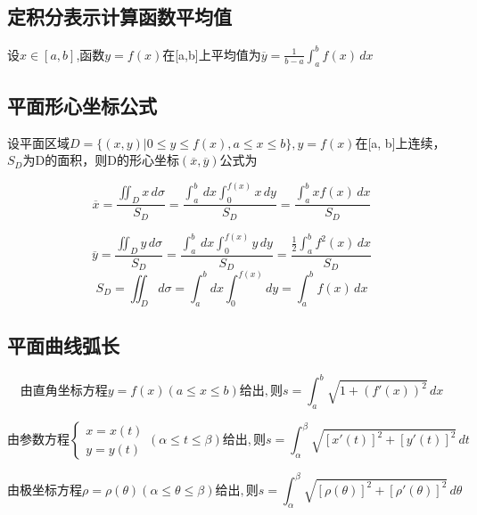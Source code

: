 \subsection{定积分表示计算函数平均值}

设\(x \in [a, b]\),函数\(y = f(x)\)在[a,b]上平均值为\(\overline{y} = \frac{1}{b- a} \int_{a}^{b} f(x) \,dx\)


\subsection{平面形心坐标公式}

设平面区域\(D = \{ (x, y) | 0 \leq y \leq f(x), a \leq x \leq b \}, y = f(x)\)在[a, b]上连续，\(S_D\)为D的面积，则D的形心坐标\((\overline{x}, \overline{y})\)公式为

\begin{displaymath}
\overline{x} = \frac{\iint_{D} x \,d\sigma}{S_D} = 
\frac{\int_{a}^{b} \,dx \int_{0}^{f(x)} x \,dy}{S_D} =
\frac{\int_{a}^{b} xf(x) \,dx}{S_D}
\end{displaymath}

\begin{displaymath}
\overline{y} = \frac{\iint_{D} y \,d\sigma}{S_D} = 
\frac{\int_{a}^{b} \,dx \int_{0}^{f(x)} y \,dy}{S_D} =
\frac{\frac{1}{2}\int_{a}^{b} f^2(x) \,dx}{S_D}
\end{displaymath}
\[S_D = \iint_{D}d\sigma = \int_{a}^{b}dx \int_{0}^{f(x)}dy = \int_{a}^{b} f(x)\,dx\]


\subsection{平面曲线弧长}

\begin{displaymath}
由直角坐标方程y = f(x)(a \leq x \leq b)给出,
则s = \int_{a}^{b} \sqrt{1 + (f'(x))^2} \,dx
\end{displaymath}

\begin{displaymath}
由参数方程
\begin{cases}
x = x(t) \\
y = y(t)
\end{cases}
(\alpha \leq t \leq \beta)给出,
则s = \int_{\alpha}^{\beta} \sqrt{[x'(t)]^2 + [y'(t)]^2} \,dt
\end{displaymath}

\begin{displaymath}
由极坐标方程\rho = \rho(\theta)(\alpha \leq \theta \leq \beta)给出,
则s = \int_{\alpha}^{\beta} \sqrt{[\rho(\theta)]^2 + [\rho'(\theta)]^2} \,d\theta
\end{displaymath}


